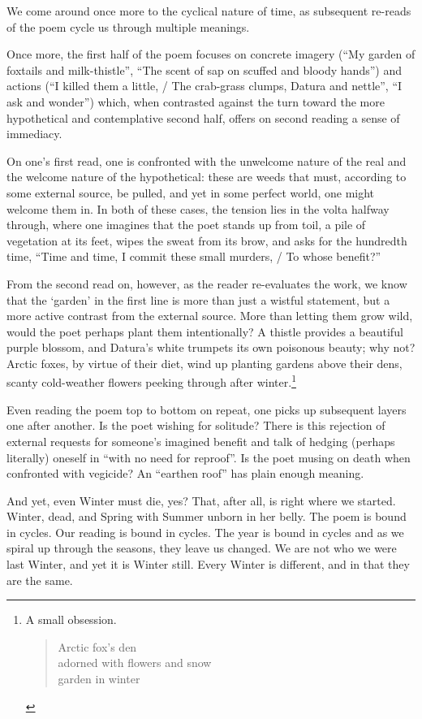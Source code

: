 \documentclass[12pt,oneside]{memoir}
\begin{document}
We come around once more to the cyclical nature of time, as subsequent re-reads of the poem cycle us through multiple meanings.

Once more, the first half of the poem focuses on concrete imagery (``My garden of foxtails and milk-thistle'', ``The scent of sap on scuffed and bloody hands'') and actions (``I killed them a little, / The crab-grass clumps, Datura and nettle'', ``I ask and wonder'') which, when contrasted against the turn toward the more hypothetical and contemplative second half, offers on second reading a sense of immediacy.

On one's first read, one is confronted with the unwelcome nature of the real and the welcome nature of the hypothetical: these are weeds that must, according to some external source, be pulled, and yet in some perfect world, one might welcome them in. In both of these cases, the tension lies in the volta halfway through, where one imagines that the poet stands up from toil, a pile of vegetation at its feet, wipes the sweat from its brow, and asks for the hundredth time, ``Time and time, I commit these small murders, / To whose benefit?''

From the second read on, however, as the reader re-evaluates the work, we know that the `garden' in the first line is more than just a wistful statement, but a more active contrast from the external source. More than letting them grow wild, would the poet perhaps plant them intentionally? A thistle provides a beautiful purple blossom, and Datura's white trumpets its own poisonous beauty; why not? Arctic foxes, by virtue of their diet, wind up planting gardens above their dens, scanty cold-weather flowers peeking through after winter.\footnote{A small obsession.\begin{verse}Arctic fox's den \\
adorned with flowers and snow \\
garden in winter
\end{verse}\parencite{arkie}}

Even reading the poem top to bottom on repeat, one picks up subsequent layers one after another. Is the poet wishing for solitude? There is this rejection of external requests for someone's imagined benefit and talk of hedging (perhaps literally) oneself in ``with no need for reproof''. Is the poet musing on death when confronted with vegicide? An “earthen roof” has plain enough meaning.

And yet, even Winter must die, yes? That, after all, is right where we started. Winter, dead, and Spring with Summer unborn in her belly. The poem is bound in cycles. Our reading is bound in cycles. The year is bound in cycles and as we spiral up through the seasons, they leave us changed. We are not who we were last Winter, and yet it is Winter still. Every Winter is different, and in that they are the same.
\end{document}

